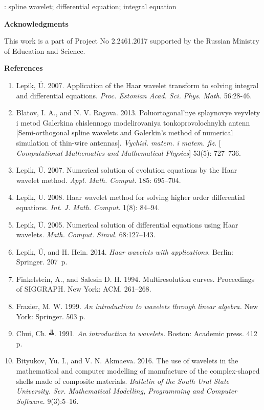 \documentclass[12pt, a4paper, oneside]{article}
\begin{document}
: spline wavelet; differential equation; integral equation
\begin{center}
{\bf Acknowledgments}
\end{center}
This work is a part of Project No 2.2461.2017 supported by the Russian Ministry of Education and Science.
\begin{center}
{\bf References}
\end{center}
\begin{enumerate}
\item Lepik,  $\overset{..}{\mathrm{U}}$. 2007. Application of the Haar wavelet transform to solving integral and differential equations. \textit{Proc. Estonian Acad. Sci. Phys. Math.} 56:28-46.
\item  Blatov,  I. A., and  N. V. Rogova. 2013.  Poluortogonal'nye splaynovye veyvlety i metod Galerkina chislennogo modelirovaniya tonkoprovolochnykh antenn [Semi-orthogonal spline wavelets and Galerkin's method of numerical simulation of thin-wire antennas]. \textit{Vychisl. matem. i matem. fiz.} [ \textit{Computational Mathematics and Mathematical Physics}] 53(5): 727--736.
\item Lepik, $\overset{..}{\mathrm{U}}$. 2007. Numerical solution of evolution equations by the Haar wavelet method. \textit{Appl. Math. Comput.} 185: 695--704.
\item Lepik,  $\overset{..}{\mathrm{U}}$. 2008. Haar wavelet method for solving higher order differential equations. \textit{Int. J. Math. Comput.} 1(8): 84--94.
\item  Lepik,  $\overset{..}{\mathrm{U}}$. 2005. Numerical solution of differential equations using Haar wavelets. \textit{ Math. Comput. Simul.} 68:127--143.
\item Lepik,  $\overset{..}{\mathrm{U}}$, and H. Hein. 2014. \textit{Haar wavelets with applications.}  Berlin: Springer. 207~p.
\item Finkelstein, A., and Salesin D. H. 1994. Multiresolution curves. Proceedings of SIGGRAPH.  New York: ACM. 261--268.
\item Frazier, M. W. 1999. \textit{ An introduction to wavelets through linear algebra.} New York: Springer. 503 p.
\item Chui,  Ch. ╩. 1991. \textit{An introduction to wavelets.} Boston: Academic press. 412 p.
\item Bityukov, Yu. I., and  V. N. Akmaeva. 2016. The use of wavelets in the mathematical and computer modelling of manufacture of the complex-shaped shells made of composite materials.   \textit{Bulletin of the South Ural State University. Ser. Mathematical Modelling, Programming and Computer Software}. 9(3):5--16.

\end{enumerate}
\end{document}
